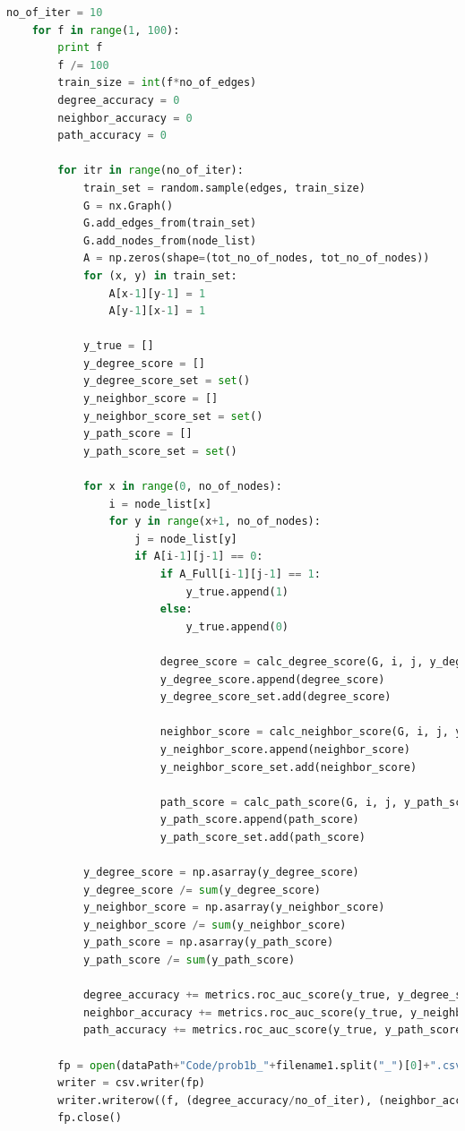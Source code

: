 \documentclass{article}
\begin{document}
\begin{lstlisting}[language=Python, breaklines=true]
    no_of_iter = 10
    for f in range(1, 100):
        print f
        f /= 100
        train_size = int(f*no_of_edges)
        degree_accuracy = 0
        neighbor_accuracy = 0
        path_accuracy = 0
    
        for itr in range(no_of_iter):
            train_set = random.sample(edges, train_size)
            G = nx.Graph()
            G.add_edges_from(train_set)
            G.add_nodes_from(node_list)
            A = np.zeros(shape=(tot_no_of_nodes, tot_no_of_nodes))
            for (x, y) in train_set:
                A[x-1][y-1] = 1
                A[y-1][x-1] = 1
            
            y_true = []
            y_degree_score = []
            y_degree_score_set = set()
            y_neighbor_score = []
            y_neighbor_score_set = set()
            y_path_score = []
            y_path_score_set = set()
    
            for x in range(0, no_of_nodes):
                i = node_list[x]
                for y in range(x+1, no_of_nodes):
                    j = node_list[y]
                    if A[i-1][j-1] == 0:
                        if A_Full[i-1][j-1] == 1:
                            y_true.append(1)
                        else:
                            y_true.append(0)
    
                        degree_score = calc_degree_score(G, i, j, y_degree_score_set)
                        y_degree_score.append(degree_score)
                        y_degree_score_set.add(degree_score)
    
                        neighbor_score = calc_neighbor_score(G, i, j, y_neighbor_score_set)
                        y_neighbor_score.append(neighbor_score)
                        y_neighbor_score_set.add(neighbor_score)
    
                        path_score = calc_path_score(G, i, j, y_path_score_set)
                        y_path_score.append(path_score)
                        y_path_score_set.add(path_score)
    
            y_degree_score = np.asarray(y_degree_score)
            y_degree_score /= sum(y_degree_score)
            y_neighbor_score = np.asarray(y_neighbor_score)
            y_neighbor_score /= sum(y_neighbor_score)
            y_path_score = np.asarray(y_path_score)
            y_path_score /= sum(y_path_score)
    
            degree_accuracy += metrics.roc_auc_score(y_true, y_degree_score)
            neighbor_accuracy += metrics.roc_auc_score(y_true, y_neighbor_score)
            path_accuracy += metrics.roc_auc_score(y_true, y_path_score)
    
        fp = open(dataPath+"Code/prob1b_"+filename1.split("_")[0]+".csv", "a")
        writer = csv.writer(fp)
        writer.writerow((f, (degree_accuracy/no_of_iter), (neighbor_accuracy/no_of_iter), (path_accuracy/no_of_iter)))
        fp.close()

\end{lstlisting}
\end{document}
